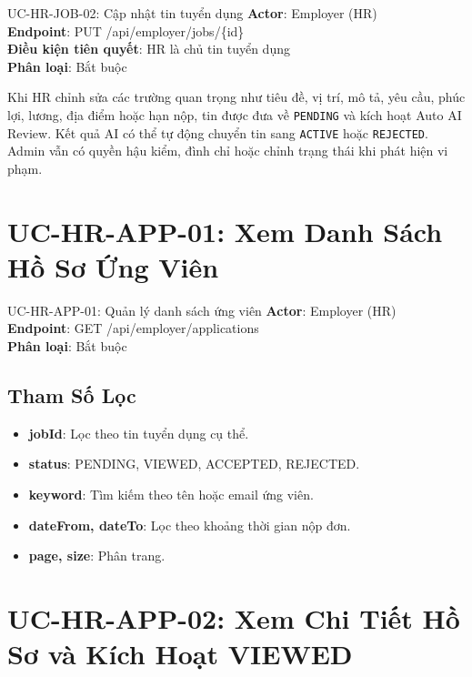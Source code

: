 \documentclass[12pt, a4paper]{report}
\begin{document}
\begin{requirementbox}{UC-HR-JOB-02: Cập nhật tin tuyển dụng}
\textbf{Actor}: Employer (HR) \\
\textbf{Endpoint}: PUT /api/employer/jobs/\{id\} \\
\textbf{Điều kiện tiên quyết}: HR là chủ tin tuyển dụng \\
\textbf{Phân loại}: Bắt buộc
\end{requirementbox}

Khi HR chỉnh sửa các trường quan trọng như tiêu đề, vị trí, mô tả, yêu cầu, phúc lợi, lương, địa điểm hoặc hạn nộp, tin được đưa về \texttt{PENDING} và kích hoạt Auto AI Review. Kết quả AI có thể tự động chuyển tin sang \texttt{ACTIVE} hoặc \texttt{REJECTED}. Admin vẫn có quyền hậu kiểm, đình chỉ hoặc chỉnh trạng thái khi phát hiện vi phạm.

\section{UC-HR-APP-01: Xem Danh Sách Hồ Sơ Ứng Viên}

\begin{requirementbox}{UC-HR-APP-01: Quản lý danh sách ứng viên}
\textbf{Actor}: Employer (HR) \\
\textbf{Endpoint}: GET /api/employer/applications \\
\textbf{Phân loại}: Bắt buộc
\end{requirementbox}

\subsection{Tham Số Lọc}

\begin{itemize}
    \item \textbf{jobId}: Lọc theo tin tuyển dụng cụ thể.
    \item \textbf{status}: PENDING, VIEWED, ACCEPTED, REJECTED.
    \item \textbf{keyword}: Tìm kiếm theo tên hoặc email ứng viên.
    \item \textbf{dateFrom, dateTo}: Lọc theo khoảng thời gian nộp đơn.
    \item \textbf{page, size}: Phân trang.
\end{itemize}

\section{UC-HR-APP-02: Xem Chi Tiết Hồ Sơ và Kích Hoạt VIEWED}
\end{document}
